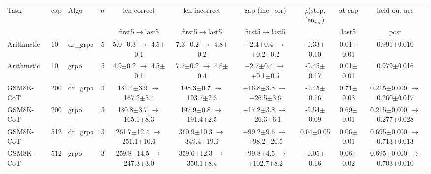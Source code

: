 \small
\begin{tabular}{lllrcccccc}
\toprule
Task & cap & Algo & $n$ & len correct & len incorrect & gap (inc$-$cor) & $\rho$(step, len$_{inc}$) & at-cap & held-out acc \\
 & & & & first5\(\to\)last5 & first5\(\to\)last5 & first5\(\to\)last5 & & last5 & post \\
\midrule
Arithmetic & 10 & dr\_grpo & 5 & 5.0$\pm$0.3 $\to$ 4.5$\pm$0.1 & 7.3$\pm$0.2 $\to$ 4.8$\pm$0.2 & +2.4$\pm$0.4 $\to$ +0.2$\pm$0.2 & -0.33$\pm$0.10 & 0.01$\pm$0.01 & 0.991$\pm$0.010 \\
Arithmetic & 10 & grpo & 5 & 4.9$\pm$0.2 $\to$ 4.5$\pm$0.1 & 7.7$\pm$0.2 $\to$ 4.6$\pm$0.4 & +2.7$\pm$0.4 $\to$ +0.1$\pm$0.5 & -0.45$\pm$0.17 & 0.01$\pm$0.01 & 0.979$\pm$0.016 \\
GSM8K-CoT & 200 & dr\_grpo & 3 & 181.4$\pm$3.9 $\to$ 167.2$\pm$5.4 & 198.3$\pm$0.7 $\to$ 193.7$\pm$2.3 & +16.8$\pm$3.8 $\to$ +26.5$\pm$3.6 & -0.45$\pm$0.16 & 0.71$\pm$0.03 & 0.215$\pm$0.000 $\to$ 0.260$\pm$0.017 \\
GSM8K-CoT & 200 & grpo & 3 & 180.8$\pm$3.7 $\to$ 165.1$\pm$8.3 & 197.9$\pm$0.8 $\to$ 191.4$\pm$2.5 & +17.2$\pm$3.8 $\to$ +26.3$\pm$6.1 & -0.54$\pm$0.09 & 0.69$\pm$0.01 & 0.215$\pm$0.000 $\to$ 0.277$\pm$0.028 \\
GSM8K-CoT & 512 & dr\_grpo & 3 & 261.7$\pm$12.4 $\to$ 251.1$\pm$10.0 & 360.9$\pm$10.3 $\to$ 349.4$\pm$19.6 & +99.2$\pm$9.6 $\to$ +98.2$\pm$20.5 & 0.04$\pm$0.05 & 0.06$\pm$0.01 & 0.695$\pm$0.000 $\to$ 0.713$\pm$0.013 \\
GSM8K-CoT & 512 & grpo & 3 & 259.8$\pm$14.5 $\to$ 247.3$\pm$3.0 & 359.6$\pm$12.3 $\to$ 350.1$\pm$8.4 & +99.8$\pm$4.5 $\to$ +102.7$\pm$8.2 & -0.05$\pm$0.16 & 0.06$\pm$0.02 & 0.695$\pm$0.000 $\to$ 0.703$\pm$0.010 \\
\bottomrule
\end{tabular}
